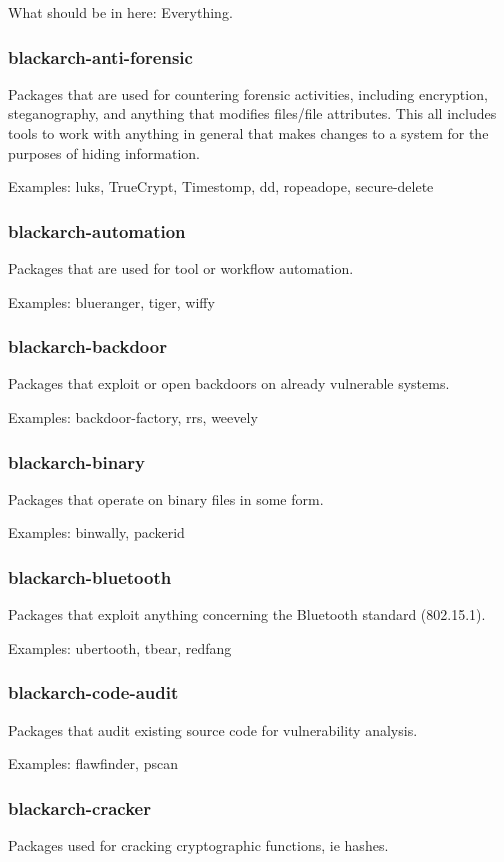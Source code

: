 \documentclass[a4paper, oneside, 11pt]{book}
\begin{document}
What should be in here: Everything.

\subsubsection{blackarch-anti-forensic}
Packages that are used for countering forensic activities,
including encryption, steganography, and anything that modifies files/file attributes.
This all includes tools to work with anything in general that makes changes to a system
for the purposes of hiding information.

Examples: luks, TrueCrypt, Timestomp, dd, ropeadope, secure-delete

\subsubsection{blackarch-automation}
Packages that are used for tool or workflow automation.

Examples: blueranger, tiger, wiffy

\subsubsection{blackarch-backdoor}
Packages that exploit or open backdoors on already vulnerable systems.

Examples: backdoor-factory, rrs, weevely

\subsubsection{blackarch-binary}
Packages that operate on binary files in some form.

Examples: binwally, packerid

\subsubsection{blackarch-bluetooth}
Packages that exploit anything concerning the Bluetooth standard (802.15.1).

Examples: ubertooth, tbear, redfang

\subsubsection{blackarch-code-audit}
Packages that audit existing source code for vulnerability analysis.

Examples: flawfinder, pscan

\subsubsection{blackarch-cracker}
Packages used for cracking cryptographic functions, ie hashes.
\end{document}
